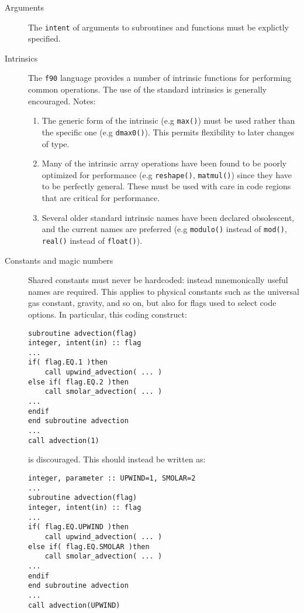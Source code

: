\begin{description}
\item[Arguments] The \texttt{intent} of arguments to subroutines and
  functions must be explictly specified.
  
\item[Intrinsics] The \texttt{f90} language provides a number of
  intrinsic functions for performing common operations. The use of the
  standard intrinsics is generally encouraged. Notes:

\begin{enumerate}
\item The generic form of the intrinsic (e.g \texttt{max()}) must be
  used rather than the specific one (e.g \texttt{dmax0()}). This
  permits flexibility to later changes of type.
\item Many of the intrinsic array operations have been found to be
  poorly optimized for performance (e.g \texttt{reshape()},
  \texttt{matmul()}) since they have to be perfectly general. These
  must be used with care in code regions that are critical for
  performance.
\item Several older standard intrinsic names have been declared
  obsolescent, and the current names are preferred (e.g
  \texttt{modulo()} instead of \texttt{mod()}, \texttt{real()} instead
  of \texttt{float()}).
\end{enumerate}
  
\item[Constants and magic numbers] Shared constants
  must never be hardcoded: instead mnemonically useful names are
  required. This applies to physical constants such as the universal
  gas constant, gravity, and so on, but also for flags used to select
  code options. In particular, this coding construct:

\begin{verbatim}
subroutine advection(flag)
integer, intent(in) :: flag
...
if( flag.EQ.1 )then
    call upwind_advection( ... )
else if( flag.EQ.2 )then
    call smolar_advection( ... )
...
endif
end subroutine advection
...
call advection(1)
\end{verbatim}

is discouraged. This should instead be written as:

\begin{verbatim}
integer, parameter :: UPWIND=1, SMOLAR=2
...
subroutine advection(flag)
integer, intent(in) :: flag
...
if( flag.EQ.UPWIND )then
    call upwind_advection( ... )
else if( flag.EQ.SMOLAR )then
    call smolar_advection( ... )
...
endif
end subroutine advection
...
call advection(UPWIND)
\end{verbatim}


\end{description}
